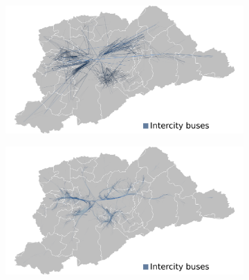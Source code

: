 \begin{figure}[!htb]
  \raggedright\noindent\hspace{-.02\textwidth}%
  \begin{subfigure}{0.55\textwidth}
    \centering
    \includegraphics[width=1\textwidth]{../figuras/busesLocalXmetropolitan/unbundled-metropolitan-buses.png}
    \caption{\label{fig:bus-integration-c}}
  \end{subfigure}\nobreak%
  \hspace{-.06\textwidth}\nobreak%
  \begin{subfigure}{0.55\textwidth}
    \centering
    \includegraphics[width=1\textwidth]{../figuras/busesLocalXmetropolitan/bundled-metropolitan-buses-length.png}
    \caption{ \label{fig:bus-integration-d}}
  \end{subfigure}


\end{figure}
